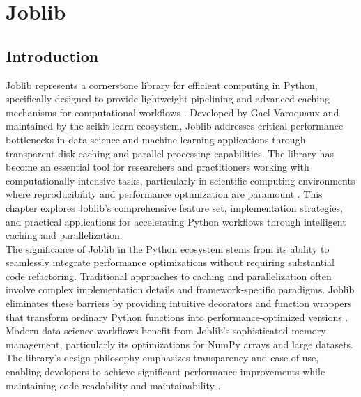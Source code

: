 %
%
%


%
%

\chapter{Joblib}
\label{ch:joblib}

\section{Introduction}
\label{sec:intro}

Joblib represents a cornerstone library for efficient computing in Python, specifically designed to provide lightweight pipelining and advanced caching mechanisms for computational workflows \cite{Joblib:2024}. Developed by Gael Varoquaux and maintained by the scikit-learn ecosystem, Joblib addresses critical performance bottlenecks in data science and machine learning applications through transparent disk-caching and parallel processing capabilities. The library has become an essential tool for researchers and practitioners working with computationally intensive tasks, particularly in scientific computing environments where reproducibility and performance optimization are paramount \cite{Varoquaux:2022}. This chapter explores Joblib's comprehensive feature set, implementation strategies, and practical applications for accelerating Python workflows through intelligent caching and parallelization.\\

The significance of Joblib in the Python ecosystem stems from its ability to seamlessly integrate performance optimizations without requiring substantial code refactoring. Traditional approaches to caching and parallelization often involve complex implementation details and framework-specific paradigms. Joblib eliminates these barriers by providing intuitive decorators and function wrappers that transform ordinary Python functions into performance-optimized versions \cite{Joblib:2024}. Modern data science workflows benefit from Joblib's sophisticated memory management, particularly its optimizations for NumPy arrays and large datasets. The library's design philosophy emphasizes transparency and ease of use, enabling developers to achieve significant performance improvements while maintaining code readability and maintainability \cite{SciPy:2023}.\\

